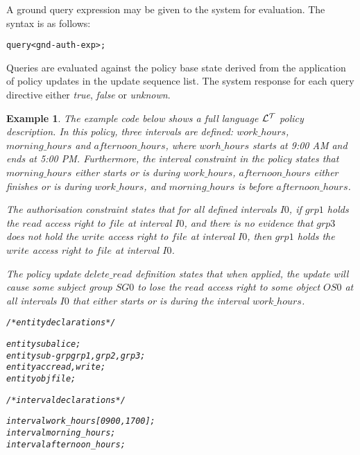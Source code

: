 \documentclass[11pt]{report}
\newtheorem{vexample}{Example}[chapter]
\newenvironment{vverbatim}
{
  \begin{alltt}
}
{
    \vspace{-\baselineskip}
  \end{alltt}
}
\begin{document}
          A ground query expression may be given to the system for evaluation.
          The syntax is as follows:

          \begin{vverbatim}
  query <gnd-auth-exp>;
          \end{vverbatim}

          Queries are evaluated against the policy base state derived from the
          application of policy updates in the update sequence list. The system
          response for each query directive either {\em true}, {\em false} or
          {\em unknown}.

        \begin{vexample}
          \label{ex-4-2}
          The example code below shows a full language ${\cal L^T}$ policy
          description. In this policy, three intervals are defined:
          $work\_hours$, $morning\_hours$ and $afternoon\_hours$, where
          $worh\_hours$ starts at 9:00 AM and ends at 5:00 PM. Furthermore,
          the interval constraint in the policy states that $morning\_hours$
          either {\em starts} or is {\em during} $work\_hours$,
          $afternoon\_hours$ either {\em finishes} or is {\em during}
          $work\_hours$, and $morning\_hours$ is {\em before}
          $afternoon\_hours$.

          The authorisation constraint states that for all defined intervals
          $I0$, if $grp1$ holds the $read$ access right to $file$ at interval
          $I0$, and there is no evidence that $grp3$ does not hold the $write$
          access right to $file$ at interval $I0$, then $grp1$ holds the
          $write$ access right to $file$ at interval $I0$.

          The policy update $delete\_read$ definition states that when applied,
          the update will cause some subject group $SG0$ to lose the $read$
          access right to some object $OS0$ at all intervals $I0$ that either
          {\em starts} or is {\em during} the interval $work\_hours$.

          \begin{vverbatim}
  /* entity declarations */

  entity sub alice;
  entity sub-grp grp1, grp2, grp3;
  entity acc read, write;
  entity obj file;

  /* interval declarations */

  interval work\_hours [0900, 1700];
  interval morning\_hours;
  interval afternoon\_hours;


\end{vverbatim}
\end{vexample}
\end{document}
